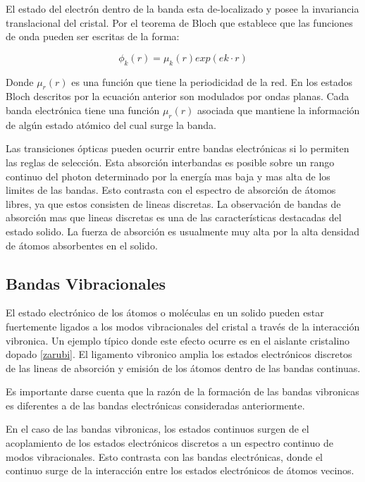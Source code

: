\documentclass[a4paper,openright,12pt]{book}
\begin{document}
 
 
El estado del electrón dentro de la banda esta de-localizado y posee la invariancia translacional del cristal. Por el teorema de Bloch que establece que las funciones de onda pueden ser escritas de la forma:

\begin{equation}
\phi_{k}(r)=\mu_{k}(r)exp(ek\cdot r)
\end{equation}

Donde $\mu_{r}(r)$ es una función que tiene la periodicidad de la red. En los estados Bloch descritos por la ecuación anterior son modulados por ondas planas. Cada banda electrónica tiene una función $\mu_{r}(r)$ asociada que mantiene la información de algún estado atómico del cual surge la banda. 

Las transiciones ópticas pueden ocurrir entre bandas electrónicas si lo permiten las reglas de selección. Esta absorción interbandas es posible sobre un rango continuo  del photon determinado por la energía mas baja y mas alta de los limites de las bandas. Esto contrasta con el espectro de absorción de átomos libres, ya que estos consisten de lineas discretas. La observación de bandas de absorción mas que lineas discretas es una de las características destacadas del estado solido. La fuerza de absorción es usualmente muy alta por la alta densidad de átomos absorbentes en el solido.

\subsection{Bandas Vibracionales}

El estado electrónico de los átomos o moléculas en un solido pueden estar fuertemente ligados a los modos vibracionales del cristal a través de la interacción vibronica. Un ejemplo típico donde este efecto ocurre es en el aislante cristalino dopado \ref{zarubi}. El ligamento vibronico amplia los estados electrónicos discretos de las lineas de absorción y emisión de los átomos dentro de las bandas continuas. 

Es importante darse cuenta que la razón de la formación de las bandas vibronicas es diferentes a de las bandas electrónicas consideradas anteriormente. 

En el caso de las bandas vibronicas, los estados continuos surgen de el acoplamiento de los estados electrónicos discretos a un espectro continuo de modos vibracionales. Esto contrasta con las bandas electrónicas, donde el continuo surge de la interacción entre los estados electrónicos de átomos vecinos.
\end{document}
